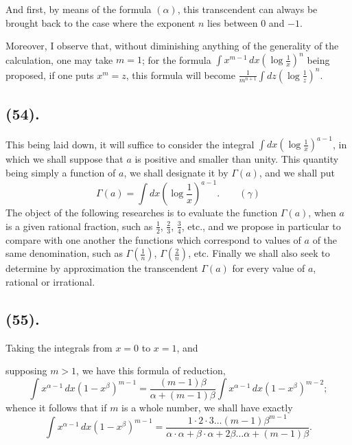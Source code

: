 \documentclass{article}
\begin{document}
And first, by means of the formula $(\alpha)$, this transcendent can always be brought back to the case where the exponent $n$ lies between 0 and $-1$.

Moreover, I observe that, without diminishing anything of the generality of the calculation, one may take $m=1$; for the formula $\displaystyle\int x^{m-1}\,dx\left(\log\frac{1}{x}\right)^{n}$ being proposed, if one puts $x^{m}=z$, this formula will become $\displaystyle\frac{1}{m^{n+1}}\int dz\left(\log\frac{1}{z}\right)^{n}$.

\subsection*{(54).}

This being laid down, it will suffice to consider the integral $\displaystyle\int dx\left(\log\frac{1}{x}\right)^{a-1}$, in which we shall suppose that $a$ is positive and smaller than unity. This quantity being simply a function of $a$, we shall designate it by $\Gamma(a)$, and we shall put
\[ \Gamma(a)=\int dx\left(\log\frac{1}{x}\right)^{a-1}.\qquad(\gamma) \]
The object of the following researches is to evaluate the function $\Gamma(a)$, when $a$ is a given rational fraction, such as $\frac{1}{2}$, $\frac{2}{3}$, $\frac{3}{4}$, etc., and we propose in particular to compare with one another the functions which correspond to values of $a$ of the same denomination, such as $\Gamma\left(\frac{1}{n}\right)$, $\Gamma\left(\frac{2}{n}\right)$, etc. Finally we shall also seek to determine by approximation the transcendent $\Gamma(a)$ for every value of $a$, rational or irrational.

\subsection*{(55).}

Taking the integrals from $x=0$ to $x=1$, and

supposing $m>1$, we have this formula of reduction,
\[ \int x^{\alpha-1}\,dx(1-x^{\beta})^{m-1}=\frac{(m-1)\beta}{\alpha+(m-1)\beta}\int x^{\alpha-1}\,dx(1-x^{\beta})^{m-2}; \]
whence it follows that if $m$ is a whole number, we shall have exactly
\[ \int x^{\alpha-1}\,dx(1-x^{\beta})^{m-1}=\frac{1\cdot 2\cdot 3\ldots(m-1)\beta^{m-1}}{\alpha\cdot\alpha+\beta\cdot\alpha+2\beta\ldots\alpha+(m-1)\beta}. \]
\end{document}
